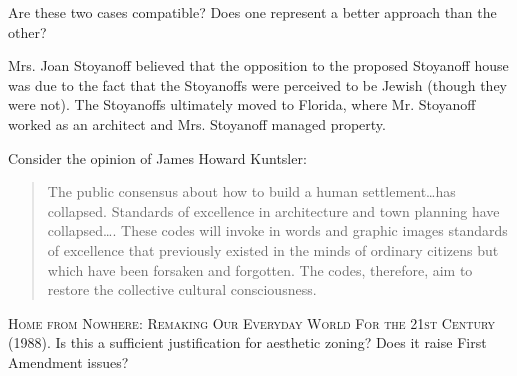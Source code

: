 
\item
Are these two cases compatible? Does one represent a better approach than the
other?

\item
Mrs. Joan Stoyanoff believed that the opposition to the proposed Stoyanoff house
was due to the fact that the Stoyanoffs were perceived to be Jewish (though they
were not). The Stoyanoffs ultimately moved to Florida, where Mr. Stoyanoff
worked as an architect and Mrs. Stoyanoff managed property.

\item
Consider the opinion of James Howard Kuntsler:
\begin{quote}
The public consensus about how to build a human settlement\ldots has collapsed.
Standards of excellence in architecture and town planning have collapsed\ldots .
These codes will invoke in words and graphic images standards of excellence that
previously existed in the minds of ordinary citizens but which have been
forsaken and forgotten. The codes, therefore, aim to restore the collective
cultural consciousness.
\end{quote}
\textsc{Home from Nowhere: Remaking Our Everyday World For the 21st Century}
(1988). Is this a sufficient justification for aesthetic zoning? Does it raise
First Amendment issues? 

